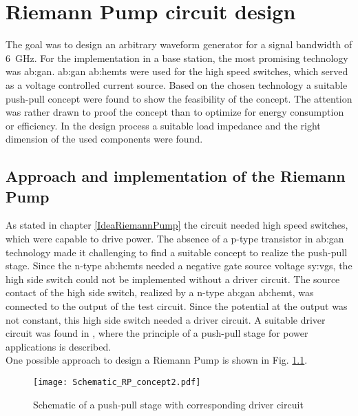 \chapter{Riemann Pump circuit design}
\label{ch:design}
The goal was to design an arbitrary waveform generator for a signal bandwidth of \SI{6}{\giga \hertz}.
For the implementation in a base station, the most promising technology was \gls{ab:gan}.
\gls{ab:gan} \glspl{ab:hemt} were used for the high speed switches, which served as a voltage controlled current source.
Based on the chosen technology a suitable push-pull concept were found \cite{MaksimovicPaper} to show the feasibility of the concept.
The attention was rather drawn to proof the concept than to optimize for energy consumption or efficiency.
In the design process a suitable load impedance and the right dimension of the used components were found.

\section{Approach and implementation of the Riemann Pump}
As stated in chapter \ref{IdeaRiemannPump} the circuit needed high speed switches, which were capable to drive power.
The absence of a p-type transistor in \gls{ab:gan} technology made it challenging to find a suitable concept to realize the push-pull stage.
Since the n-type \glspl{ab:hemt} needed a negative gate source voltage \gls{sy:vgs}, the high side switch could not be implemented without a driver circuit.
The source contact of the high side switch, realized by a n-type \gls{ab:gan} \gls{ab:hemt}, was connected to the output of the test circuit.
Since the potential at the output was not constant, this high side switch needed a driver circuit.
A suitable driver circuit was found in \cite{MaksimovicPaper}, where the principle of a push-pull stage for power applications is described.\\
One possible approach to design a Riemann Pump is shown in Fig. \ref{fig:SchematicRiemannPump}.

\begin{figure}[ht]
	\centering
  \texttt{[image: Schematic\_RP\_concept2.pdf]}
	\caption{Schematic of a push-pull stage with corresponding driver circuit}
	\label{fig:SchematicRiemannPump}
\end{figure}

